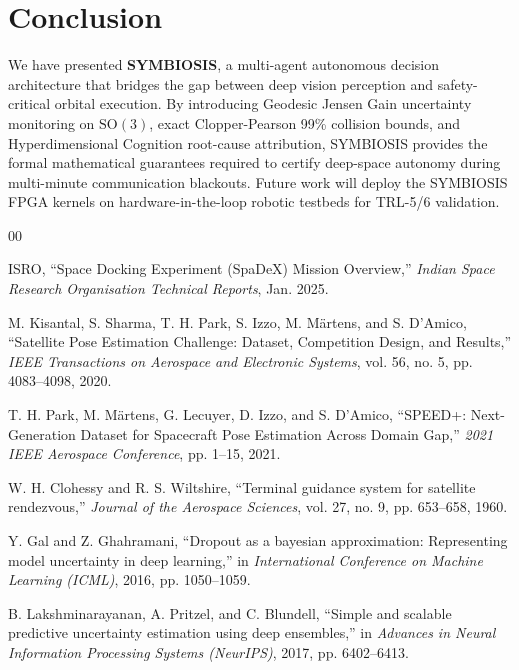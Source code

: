 \documentclass[conference]{IEEEtran}
\begin{document}
\section{Conclusion}
We have presented \textbf{SYMBIOSIS}, a multi-agent autonomous decision architecture that bridges the gap between deep vision perception and safety-critical orbital execution. By introducing Geodesic Jensen Gain uncertainty monitoring on $\mathrm{SO}(3)$, exact Clopper-Pearson 99\% collision bounds, and Hyperdimensional Cognition root-cause attribution, SYMBIOSIS provides the formal mathematical guarantees required to certify deep-space autonomy during multi-minute communication blackouts. Future work will deploy the SYMBIOSIS FPGA kernels on hardware-in-the-loop robotic testbeds for TRL-5/6 validation.

\begin{thebibliography}{00}

ISRO, ``Space Docking Experiment (SpaDeX) Mission Overview,'' \textit{Indian Space Research Organisation Technical Reports}, Jan. 2025.

M. Kisantal, S. Sharma, T. H. Park, S. Izzo, M. Märtens, and S. D'Amico, ``Satellite Pose Estimation Challenge: Dataset, Competition Design, and Results,'' \textit{IEEE Transactions on Aerospace and Electronic Systems}, vol. 56, no. 5, pp. 4083--4098, 2020.

T. H. Park, M. Märtens, G. Lecuyer, D. Izzo, and S. D'Amico, ``SPEED+: Next-Generation Dataset for Spacecraft Pose Estimation Across Domain Gap,'' \textit{2021 IEEE Aerospace Conference}, pp. 1--15, 2021.

W. H. Clohessy and R. S. Wiltshire, ``Terminal guidance system for satellite rendezvous,'' \textit{Journal of the Aerospace Sciences}, vol. 27, no. 9, pp. 653--658, 1960.

Y. Gal and Z. Ghahramani, ``Dropout as a bayesian approximation: Representing model uncertainty in deep learning,'' in \textit{International Conference on Machine Learning (ICML)}, 2016, pp. 1050--1059.

B. Lakshminarayanan, A. Pritzel, and C. Blundell, ``Simple and scalable predictive uncertainty estimation using deep ensembles,'' in \textit{Advances in Neural Information Processing Systems (NeurIPS)}, 2017, pp. 6402--6413.

\end{thebibliography}
\end{document}
